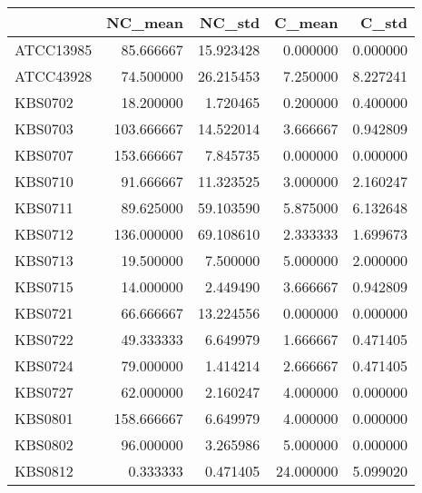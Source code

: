 \begin{tabular}{lrrrr}
\toprule
{} &     NC\_mean &     NC\_std &     C\_mean &     C\_std \\
\midrule
ATCC13985 &   85.666667 &  15.923428 &   0.000000 &  0.000000 \\
ATCC43928 &   74.500000 &  26.215453 &   7.250000 &  8.227241 \\
KBS0702   &   18.200000 &   1.720465 &   0.200000 &  0.400000 \\
KBS0703   &  103.666667 &  14.522014 &   3.666667 &  0.942809 \\
KBS0707   &  153.666667 &   7.845735 &   0.000000 &  0.000000 \\
KBS0710   &   91.666667 &  11.323525 &   3.000000 &  2.160247 \\
KBS0711   &   89.625000 &  59.103590 &   5.875000 &  6.132648 \\
KBS0712   &  136.000000 &  69.108610 &   2.333333 &  1.699673 \\
KBS0713   &   19.500000 &   7.500000 &   5.000000 &  2.000000 \\
KBS0715   &   14.000000 &   2.449490 &   3.666667 &  0.942809 \\
KBS0721   &   66.666667 &  13.224556 &   0.000000 &  0.000000 \\
KBS0722   &   49.333333 &   6.649979 &   1.666667 &  0.471405 \\
KBS0724   &   79.000000 &   1.414214 &   2.666667 &  0.471405 \\
KBS0727   &   62.000000 &   2.160247 &   4.000000 &  0.000000 \\
KBS0801   &  158.666667 &   6.649979 &   4.000000 &  0.000000 \\
KBS0802   &   96.000000 &   3.265986 &   5.000000 &  0.000000 \\
KBS0812   &    0.333333 &   0.471405 &  24.000000 &  5.099020 \\
\bottomrule
\end{tabular}
